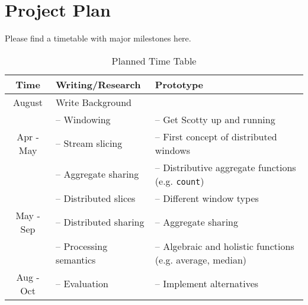 \section{Project Plan}
\label{sec:plan}

Please find a timetable with major milestones here.

\begin{table}[h!]
    \centering
    \begin{tabular}{ | c | m{} | m{} | }
        \hline
        \textbf{Time} & \textbf{Writing/Research} & \textbf{Prototype} \\
        \hline
        August  & Write Background & \\

        \hline
                  & -- Windowing         & -- Get Scotty up and running\\
        Apr - May & -- Stream slicing    & -- First concept of distributed windows\\
                  & -- Aggregate sharing & -- Distributive aggregate functions (e.g. \texttt{count})\\
        \hline
                  & -- Distributed slices   & -- Different window types\\
        May - Sep & -- Distributed sharing  & -- Aggregate sharing\\
                  & -- Processing semantics & -- Algebraic and holistic functions (e.g. average, median)\\
        \hline
        Aug - Oct & -- Evaluation & -- Implement alternatives \\
        \hline
    \end{tabular}
    \caption{Planned Time Table}
    \label{tab:time-table}
\end{table}
